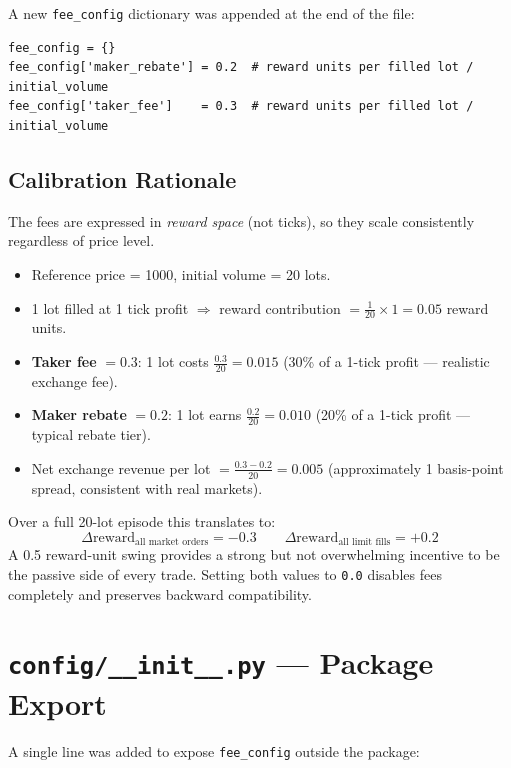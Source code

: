\documentclass[11pt,a4paper]{article}
\begin{document}
A new \texttt{fee\_config} dictionary was appended at the end of the file:

\begin{lstlisting}
fee_config = {}
fee_config['maker_rebate'] = 0.2  # reward units per filled lot / initial_volume
fee_config['taker_fee']    = 0.3  # reward units per filled lot / initial_volume
\end{lstlisting}

\subsection{Calibration Rationale}

The fees are expressed in \emph{reward space} (not ticks), so they scale
consistently regardless of price level.

\begin{itemize}[leftmargin=*]
    \item Reference price = 1000, initial volume = 20 lots.
    \item 1 lot filled at 1 tick profit $\Rightarrow$ reward contribution
          $= \frac{1}{20} \times 1 = 0.05$ reward units.
    \item \textbf{Taker fee} $= 0.3$: 1 lot costs $\frac{0.3}{20} = 0.015$
          (30\% of a 1-tick profit — realistic exchange fee).
    \item \textbf{Maker rebate} $= 0.2$: 1 lot earns $\frac{0.2}{20} = 0.010$
          (20\% of a 1-tick profit — typical rebate tier).
    \item Net exchange revenue per lot $= \frac{0.3 - 0.2}{20} = 0.005$
          (approximately 1 basis-point spread, consistent with real markets).
\end{itemize}

Over a full 20-lot episode this translates to:
\[
    \Delta\text{reward}_{\text{all market orders}} = -0.3
    \qquad
    \Delta\text{reward}_{\text{all limit fills}} = +0.2
\]
A 0.5 reward-unit swing provides a strong but not overwhelming incentive
to be the passive side of every trade.  Setting both values to \texttt{0.0}
disables fees completely and preserves backward compatibility.

\section{\texttt{config/\_\_init\_\_.py} — Package Export}

A single line was added to expose \texttt{fee\_config} outside the package:
\end{document}
